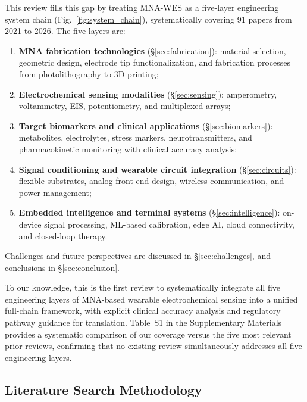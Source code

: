 \documentclass[review,1p]{elsarticle}
\begin{document}
This review fills this gap by treating MNA-WES as a five-layer engineering system chain (Fig.~\ref{fig:system_chain}), systematically covering 91 papers from 2021 to 2026. The five layers are:
\begin{enumerate}
    \item \textbf{MNA fabrication technologies} (\S\ref{sec:fabrication}): material selection, geometric design, electrode tip functionalization, and fabrication processes from photolithography to 3D printing;
    \item \textbf{Electrochemical sensing modalities} (\S\ref{sec:sensing}): amperometry, voltammetry, EIS, potentiometry, and multiplexed arrays;
    \item \textbf{Target biomarkers and clinical applications} (\S\ref{sec:biomarkers}): metabolites, electrolytes, stress markers, neurotransmitters, and pharmacokinetic monitoring with clinical accuracy analysis;
    \item \textbf{Signal conditioning and wearable circuit integration} (\S\ref{sec:circuits}): flexible substrates, analog front-end design, wireless communication, and power management;
    \item \textbf{Embedded intelligence and terminal systems} (\S\ref{sec:intelligence}): on-device signal processing, ML-based calibration, edge AI, cloud connectivity, and closed-loop therapy.
\end{enumerate}
Challenges and future perspectives are discussed in \S\ref{sec:challenges}, and conclusions in \S\ref{sec:conclusion}.

To our knowledge, this is the first review to systematically integrate all five engineering layers of MNA-based wearable electrochemical sensing into a unified full-chain framework, with explicit clinical accuracy analysis and regulatory pathway guidance for translation. Table~S1 in the Supplementary Materials provides a systematic comparison of our coverage versus the five most relevant prior reviews, confirming that no existing review simultaneously addresses all five engineering layers.

\subsection{Literature Search Methodology}
\label{subsec:search}
\end{document}
